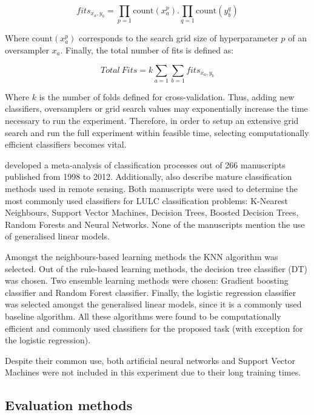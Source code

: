 \documentclass[parskip=full]{scrartcl}
\begin{document}
\begin{equation}
fits_{x_a,y_b}=\prod\limits_{p=1} \textrm{count}(x_a^p).\prod\limits_{q=1}
\textrm{count}(y_b^q)
\end{equation}

Where $\textrm{count}(x_a^p)$ corresponds to the search grid size of
hyperparameter $p$ of an oversampler $x_a$. Finally, the total number of fits
is defined as:

\begin{equation}
Total\ Fits=k\sum\limits_{a=1} \sum\limits_{b=1} fits_{x_a,y_b}
\end{equation}

Where $k$ is the number of folds defined for cross-validation. Thus, adding new
classifiers, oversamplers or grid search values may exponentially increase the
time necessary to run the experiment. Therefore, in order to setup an extensive
grid search and run the full experiment within feasible time, selecting
computationally efficient classifiers becomes vital.

\cite{Khatami2016} developed a meta-analysis of classification processes out
of 266 manuscripts published from 1998 to 2012. Additionally,
\cite{Maxwell2018} also describe mature classification methods used in remote
sensing. Both manuscripts were used to determine the most commonly used
classifiers for LULC classification problems: K-Nearest Neighbours, Support
Vector Machines, Decision Trees, Boosted Decision Trees, Random Forests and
Neural Networks. None of the manuscripts mention the use of generalised linear
models.

Amongst the neighbours-based learning methods the KNN algorithm was selected.
Out of the rule-based learning methods, the decision tree classifier (DT) was
chosen. Two ensemble learning methods were chosen: Gradient boosting classifier
and Random Forest classifier. Finally, the logistic regression classifier was
selected amongst the generalised linear models, since it is a commonly used
baseline algorithm. All these algorithms were found to be computationally
efficient and commonly used classifiers for the proposed task (with exception
for the logistic regression).

Despite their common use, both artificial neural networks and Support Vector
Machines were not included in this experiment due to their long training times.

\subsection{Evaluation methods} \label{evaluation methods}
\end{document}
